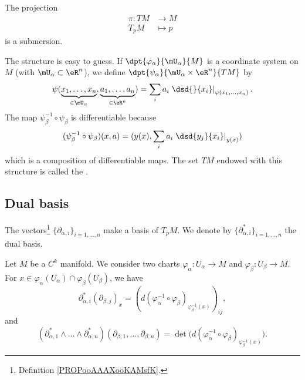 \begin{proposition}			\label{PROPooMDDPooXeQwrH}
	The projection
	\begin{equation}
		\begin{aligned}
			\pi \colon TM & \to M     \\
			T_pM          & \mapsto p
		\end{aligned}
	\end{equation}
	is a submersion.
\end{proposition}

The structure is easy to guess. If $\dpt{\varphi_{\alpha}}{\mU_{\alpha}}{M}$ is a coordinate system on $M$ (with $\mU_{\alpha}\subset\eR^n$), we define $\dpt{\psi_{\alpha}}{\mU_{\alpha}\times \eR^n}{TM}$ by
\[
	\psi( \underbrace{x_1,\ldots, x_n}_{\in\mU_{\alpha}},\underbrace{a_1,\ldots, a_n}_{\in\eR^n}  )
	=\sum_i a_i\left.\dsd{}{x_i}\right|_{\varphi(x_1,\ldots,x_n)}.
\]
The map $\psi_{\beta}^{-1}\circ\psi_{\beta}$ is differentiable because
\[
	(\psi_{\beta}^{-1}\circ\psi_{\beta})(x,a)=( y(x),\sum_i a_i\left.\dsd{y_j}{x_i}\right|_{y(x)}  )
\]
which is a composition of differentiable maps. The set $TM$ endowed with this structure is called the .


\subsection{Dual basis}


\begin{definition}		\label{DEFooZNHIooKIpND}
	The vectors\footnote{Definition \ref{PROPooAAAXooKAMsfK}.} \( \{ \partial_{\alpha,i} \}_{i=1,\ldots,n}\) make a basis of \( T_pM\). We denote by \( \{ \partial^*_{\alpha, i} \}_{i=1,\ldots,n}\) the dual basis.
\end{definition}

\begin{lemma}		\label{LEMooSZTOooBIzMCc}
	Let \( M\) be a \( C^k\) manifold. We consider two charts \(\varphi_{\alpha} \colon U_{\alpha}\to M  \) and \(\varphi_{\beta} \colon U_{\beta}\to M  \). For \( x\in \varphi_{\alpha}(U_{\alpha})\cap \varphi_{\beta}(U_{\beta})\), we have
	\begin{equation}		\label{EQooQNRRooKkCkLE}
		\partial^*_{\alpha,i}(\partial_{\beta,j})_x=(d(\varphi_{\alpha}^{-1}\circ \varphi_{\beta})_{\varphi_{\beta}^{-1}(x)})_{ij},
	\end{equation}
	and
	\begin{equation}		\label{EQooAGFKooWwWdAf}
		(\partial_{\alpha, 1}^*\wedge\ldots \wedge\partial_{\alpha,n}^*)(\partial_{\beta,1},\ldots,\partial_{\beta,n})=\det\big( d(\varphi_{\alpha}^{-1}\circ\varphi_{\beta})_{\varphi_{\beta}^{-1}(x)} \big).
	\end{equation}
\end{lemma}


